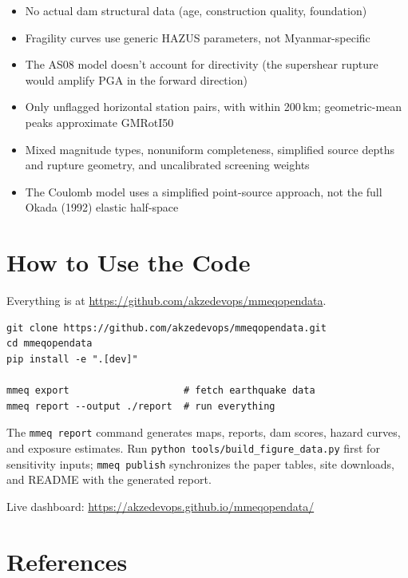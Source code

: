 \documentclass[11pt,a4paper]{article}
\begin{document}
\begin{itemize}
    \item No actual dam structural data (age, construction quality, foundation)
    \item Fragility curves use generic HAZUS parameters, not Myanmar-specific
    \item The AS08 model doesn't account for directivity (the supershear rupture would amplify PGA in the forward direction)
    \item Only \StationCount{} unflagged horizontal station pairs, with \InRangeStations{} within 200\,km; geometric-mean peaks approximate GMRotI50
    \item Mixed magnitude types, nonuniform completeness, simplified source depths and rupture geometry, and uncalibrated screening weights
    \item The Coulomb model uses a simplified point-source approach, not the full Okada (1992) elastic half-space
\end{itemize}


\section{How to Use the Code}

Everything is at \url{https://github.com/akzedevops/mmeqopendata}.

\begin{verbatim}
git clone https://github.com/akzedevops/mmeqopendata.git
cd mmeqopendata
pip install -e ".[dev]"

mmeq export                    # fetch earthquake data
mmeq report --output ./report  # run everything
\end{verbatim}

The \texttt{mmeq report} command generates maps, reports, dam scores, hazard curves, and exposure estimates. Run \texttt{python tools/build\_figure\_data.py} first for sensitivity inputs; \texttt{mmeq publish} synchronizes the paper tables, site downloads, and README with the generated report.

Live dashboard: \url{https://akzedevops.github.io/mmeqopendata/}


\section*{References}
\end{document}
